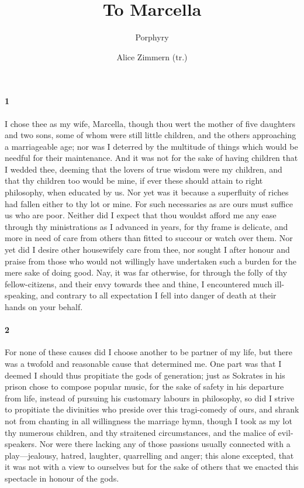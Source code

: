 \documentclass[12pt]{article}
\title{To Marcella}
\author{Porphyry \and Alice Zimmern (tr.)}
\date{}
\begin{document}
\maketitle

\paragraph{1} I chose thee as my wife, Marcella, though thou wert the mother of five daughters and two sons, some of whom were still little children, and the others approaching a marriageable age; nor was I deterred by the multitude of things which would be needful for their maintenance. And it was not for the sake of having children that I wedded thee, deeming that the lovers of true wisdom were my children, and that thy children too would be mine, if ever these should attain to right philosophy, when educated by us. Nor yet was it because a superfluity of riches had fallen either to thy lot or mine. For such necessaries as are ours must suffice us who are poor. Neither did I expect that thou wouldst afford me any ease through thy ministrations as I advanced in years, for thy frame is delicate, and more in need of care from others than fitted to succour or watch over them. Nor yet did I desire other housewifely care from thee, nor sought I after honour and praise from those who would not willingly have undertaken such a burden for the mere sake of doing good. Nay, it was far otherwise, for through the folly of thy fellow-citizens, and their envy towards thee and thine, I encountered much ill-speaking, and contrary to all expectation I fell into danger of death at their hands on your behalf.

\paragraph{2} For none of these causes did I choose another to be partner of my life, but there was a twofold and reasonable cause that determined me. One part was that I deemed I should thus propitiate the gods of generation; just as Sokrates in his prison chose to compose popular music, for the sake of safety in his departure from life, instead of pursuing his customary labours in philosophy, so did I strive to propitiate the divinities who preside over this tragi-comedy of ours, and shrank not from chanting in all willingness the marriage hymn, though I took as my lot thy numerous children, and thy straitened circumstances, and the malice of evil-speakers. Nor were there lacking any of those passions usually connected with a play---jealousy, hatred, laughter, quarrelling and anger; this alone excepted, that it was not with a view to ourselves but for the sake of others that we enacted this spectacle in honour of the gods.
\end{document}
